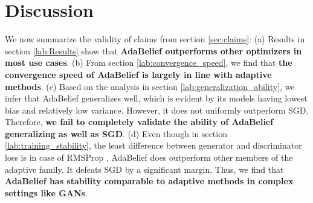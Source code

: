 \section{Discussion}
\label{sec:discussion}

We now summarize the validity of claims from section \ref{sec:claims}: (a) Results in section \ref{lab:Results} show that \textbf{AdaBelief outperforms other optimizers in most use cases}. (b) From section \ref{lab:convergence_speed}, we find that \textbf{the convergence speed of AdaBelief is largely in line with adaptive methods}. (c) Based on the analysis in section \ref{lab:generalization_ability}, we infer that AdaBelief generalizes well, which is evident by its models having lowest bias and relatively low variance. However, it does not uniformly outperform SGD. Therefore, \textbf{we fail to completely validate the ability of AdaBelief generalizing as well as SGD}. (d) Even though in section \ref{lab:training_stability}, the least difference between generator and discriminator loss is in case of RMSProp , AdaBelief does outperform other members of the adaptive family. It defeats SGD by a significant margin. Thus, we find that \textbf{AdaBelief has stability comparable to adaptive methods in complex settings like GANs}.



